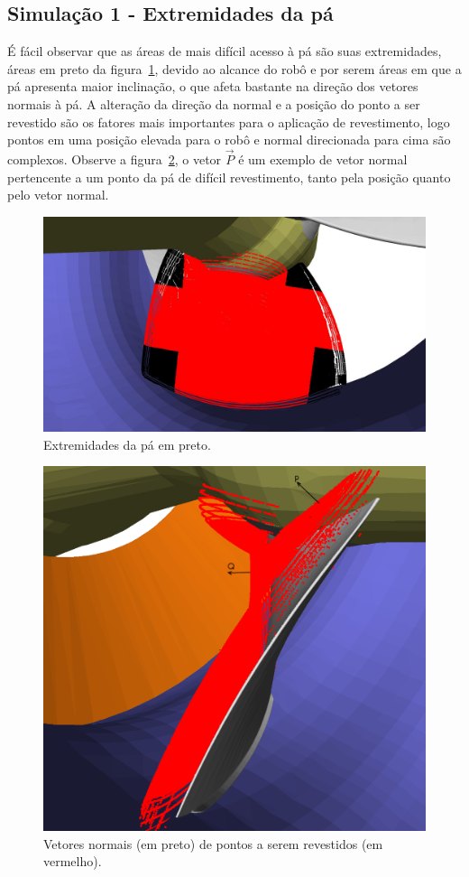 \subsection{Simulação 1 - Extremidades da pá}

É fácil observar que as áreas de mais difícil acesso à pá são suas extremidades,
áreas em preto da figura~\ref{fig::extremidades}, devido ao alcance do robô e
por serem áreas em que a pá apresenta maior inclinação, o que afeta bastante na
direção dos vetores normais à pá. A alteração da direção da normal e a posição
do ponto a ser revestido são os fatores mais importantes para o aplicação de
revestimento, logo pontos em uma posição elevada para o robô e normal
direcionada para cima são complexos. Observe a figura~\ref{fig::normal}, o vetor
$\vec{P}$ é um exemplo de vetor normal pertencente a um ponto da pá de difícil
revestimento, tanto pela posição quanto pelo vetor normal.

\begin{figure}[!ht]
	\centering	
	\includegraphics[width=.8\columnwidth]{figs/tocoat.jpg}
	\caption{Extremidades da pá em preto.}
	\label{fig::extremidades}
\end{figure}

\begin{figure}[!ht]
	\centering	
	\includegraphics[width=.5\columnwidth]{figs/normal.png}
	\caption{Vetores normais (em preto) de pontos a serem revestidos (em
	vermelho).}
	\label{fig::normal}
\end{figure}

